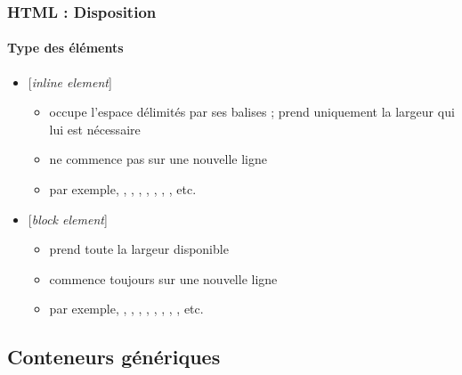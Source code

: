 \documentclass[xcolor=table]{beamer}
\begin{document}
\begin{frame}[fragile]
\frametitle{HTML : Disposition}
\framesubtitle{Type des éléments}

\begin{itemize}
	\item {} [\textit{inline element}]
	\begin{itemize}
		\item occupe l'espace délimités par ses balises ;  prend uniquement la largeur qui lui est nécessaire 
		\item ne commence pas sur une nouvelle ligne
		\item par exemple, , , , , , , , etc.
	\end{itemize}
	\item {} [\textit{block element}]
	\begin{itemize}
		\item prend toute la largeur disponible 
		\item commence toujours sur une nouvelle ligne
		\item par exemple, , , , , , , , , etc.
	\end{itemize}
\end{itemize}

\end{frame}

\subsection{Conteneurs génériques}
\end{document}
